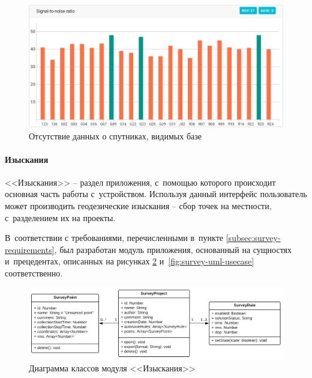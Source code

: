 \begin{figure}[h!]
  \centering
  \setlength{\fboxsep}{5pt}
  \includegraphics[width=.9\textwidth]{img/reachview/status_snr_rover}
  \vspace*{6pt}
  \caption{Отсутствие данных о спутниках, видимых базе}
  \label{fig:status-snr-rover}
\end{figure}

\paragraph{Изыскания}

<<Изыскания>> -- раздел приложения, с~помощью которого происходит основная часть работы с~устройством. Используя данный интерфейс пользователь может производить геодезические изыскания -- сбор точек на местности, с~разделением их на проекты.

В~соответствии с требованиями, перечисленными в~пункте \ref{subsec:survey-requirements}, был разработан модуль приложения, основанный на сущностях и~прецедентах, описанных на рисунках \ref{fig:survey-uml-classes} и~\ref{fig:survey-uml-usecase} соответственно.

\begin{figure}[h!]
  \centering
  \setlength{\fboxsep}{5pt}
  \includegraphics[width=\textwidth]{img/uml/survey_class}
  \caption{Диаграмма классов модуля <<Изыскания>>}
  \label{fig:survey-uml-classes}
\end{figure}

